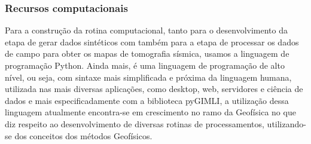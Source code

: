 \documentclass[a4paper, 12 pt]{article} %
\begin{document}

\subsubsection{Recursos computacionais}

Para a construção da rotina computacional, tanto para o desenvolvimento da etapa de gerar dados sintéticos com também para a etapa de processar os dados de campo para obter os mapas de tomografia sísmica, usamos a linguagem de programação Python. Ainda mais, é uma linguagem de programação de alto nível, ou seja, com sintaxe mais simplificada e próxima da linguagem humana, utilizada nas mais diversas aplicações, como desktop, web, servidores e ciência de dados e mais especificadamente com a biblioteca pyGIMLI, a utilização dessa linguagem atualmente encontra-se em crescimento no ramo da Geofísica no que diz respeito ao desenvolvimento de diversas rotinas de processamentos, utilizando-se dos conceitos dos métodos Geofísicos.
\end{document}
